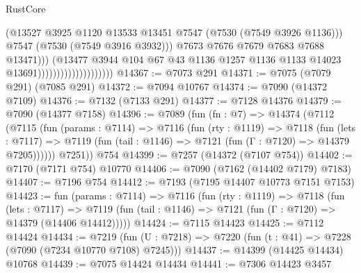 \begin{lexlean}{RustCore}
\begin{coremodule}
                                                  (@13527
                                                    @3925
                                                    @1120
                                                    @13533
                                                    @13451
                                                    @7547
                                                    (@7530 (@7549 @3926 @1136)))
                                                  @7547
                                                  (@7530 (@7549 @3916 @3932)))
                                                @7673
                                                @7676
                                                @7679
                                                @7683
                                                @7688
                                                @13471)))
                                          (@13477
                                            @3944
                                            @104
                                            @67
                                            @43
                                            @1136
                                            @1257
                                            @1136
                                            @1133
                                            @14023
                                            @13691))))))))))))))))))))
@14367 := @7073 @291
@14371 := @7075 (@7079 @291) (@7085 @291)
@14372 := @7094 @10767
@14374 := @7090 (@14372 @7109)
@14376 := @7132 (@7133 @291)
@14377 := @7128 @14376
@14379 := @7090 (@14377 @7158)
@14396 := @7089
    (fun (fn : @7) =>
    @14374
      (@7112
        (@7115
          (fun (params : @7114) =>
          @7116
            (fun (rty : @1119) =>
            @7118
              (fun (lets : @7117) =>
              @7119 (fun (tail : @1146) => @7121 (fun (Γ : @7120) => @14379 @7205))))))
        @7251))
    @754
@14399 := @7257 (@14372 (@7107 @754))
@14402 := @7170 (@7171 @754) @10770
@14406 := @7090 (@7162 (@14402 @7179) @7183)
@14407 := @7196 @754
@14412 := @7193 (@7195 @14407 @10773 @7151 @7153)
@14423 := fun (params : @7114) =>
  @7116
    (fun (rty : @1119) =>
    @7118
      (fun (lets : @7117) =>
      @7119 (fun (tail : @1146) => @7121 (fun (Γ : @7120) => @14379 (@14406 @14412)))))
@14424 := @7115 @14423
@14425 := @7112 @14424
@14434 := @7219
    (fun (U : @7218) => @7220 (fun (t : @41) => @7228 (@7090 (@7234 @10770 @7108) @7245)))
@14437 := @14399 (@14425 @14434) @10768
@14439 := @7075 @14424 @14434
@14441 := @7306 @14423 @3457

\end{coremodule}
\end{lexlean}
